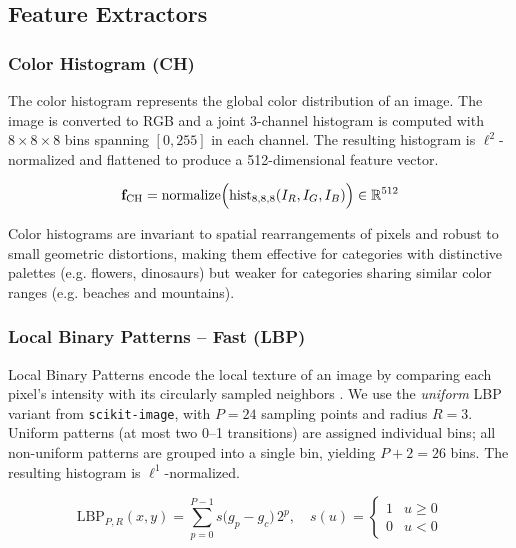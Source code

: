 \documentclass[12pt, a4paper]{article}
\begin{document}
\subsection{Feature Extractors}
\label{sec:extractors}

\subsubsection{Color Histogram (CH)}

The color histogram represents the global color distribution of an image. The image is
converted to RGB and a joint 3-channel histogram is computed with $8 \times 8 \times 8$
bins spanning $[0, 255]$ in each channel. The resulting histogram is $\ell^2$-normalized and
flattened to produce a 512-dimensional feature vector.

\begin{equation}
    \mathbf{f}_{\text{CH}} = \text{normalize}\Bigl(
        \text{hist}_{8,8,8}(I_R, I_G, I_B)
    \Bigr) \in \mathbb{R}^{512}
\end{equation}

Color histograms are invariant to spatial rearrangements of pixels and robust to small
geometric distortions, making them effective for categories with distinctive palettes (e.g.
flowers, dinosaurs) but weaker for categories sharing similar color ranges (e.g. beaches and
mountains).

\subsubsection{Local Binary Patterns -- Fast (LBP)}

Local Binary Patterns encode the local texture of an image by comparing each pixel's
intensity with its circularly sampled neighbors \cite{ojala2002}. We use the \emph{uniform}
LBP variant from \texttt{scikit-image}, with $P = 24$ sampling points and radius $R = 3$.
Uniform patterns (at most two 0--1 transitions) are assigned individual bins; all
non-uniform patterns are grouped into a single bin, yielding $P + 2 = 26$ bins. The
resulting histogram is $\ell^1$-normalized.

\begin{equation}
    \text{LBP}_{P,R}(x, y) =
    \sum_{p=0}^{P-1} s\bigl(g_p - g_c\bigr)\,2^p, \quad
    s(u) = \begin{cases} 1 & u \geq 0 \\ 0 & u < 0 \end{cases}
\end{equation}
\end{document}
